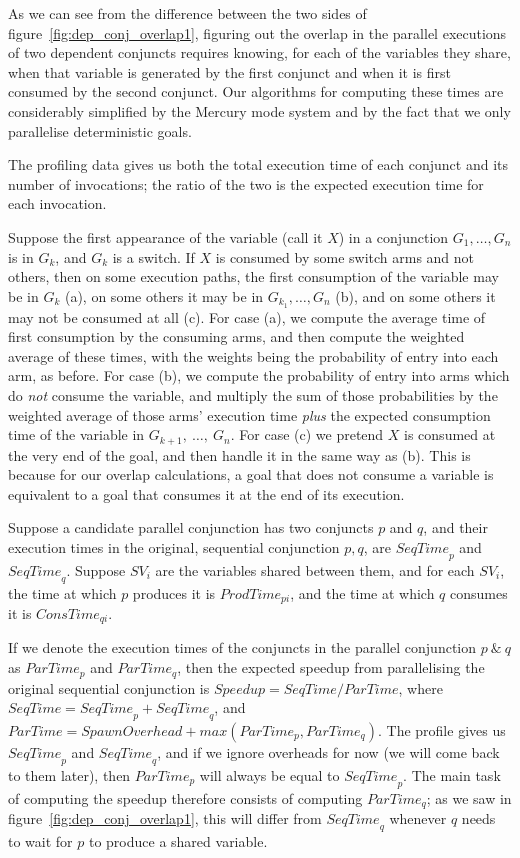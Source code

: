 As we can see from the difference between the two sides of
figure~\ref{fig:dep_conj_overlap1},
figuring out the overlap
in the parallel executions of two dependent conjuncts
requires knowing, for each of the variables they share,
when that variable is generated by the first conjunct and
when it is first consumed by the second conjunct.
Our algorithms for computing these times are considerably simplified
by the Mercury mode system
and by the fact that we only parallelise deterministic goals.

The profiling data gives us both
the total execution time of each conjunct
and its number of invocations;
the ratio of the two is the expected execution time for each invocation.


Suppose the first appearance of the variable (call it $X$)
in a conjunction $G_1, \ldots, G_n$ is in $G_k$, and $G_k$ is a switch.
If $X$ is consumed by some switch arms and not others,
then on some execution paths,
the first consumption of the variable may be in $G_k$ (a),
on some others it may be in $G_{k_1}, \ldots, G_n$ (b),
and on some others it may not be consumed at all (c).
For case (a),
we compute the average time of first consumption by the consuming arms,
and then compute the weighted average of these times,
with the weights being the probability of entry into each arm, as before.
For case (b), we compute the probability of entry
into arms which do \emph{not} consume the variable,
and multiply the sum of those probabilities
by the weighted average of those arms' execution time
\emph{plus} the expected consumption time of the variable
in $G_{k+1},~\ldots,~G_n$.
For case (c)
we pretend $X$ is consumed at the very end of the goal,
and then handle it in the same way as (b).
This is because for our overlap calculations,
a goal that does not consume a variable is equivalent to
a goal that consumes it at the end of its execution.


Suppose a candidate parallel conjunction has two conjuncts $p$ and $q$,
and their execution times in the original, sequential conjunction $p, q$,
are ${SeqTime}_p$ and ${SeqTime}_q$.
Suppose ${SV}_i$ are the variables shared between them,
and for each ${SV}_i$,
the time at which $p$ produces it is ${ProdTime}_{pi}$, and
the time at which $q$ consumes it is ${ConsTime}_{qi}$.

If we denote the execution times of the conjuncts
in the parallel conjunction $p~\&~q$
as ${ParTime}_p$ and ${ParTime}_q$,
then the expected speedup
from parallelising the original sequential conjunction
is ${Speedup} = {SeqTime} / {ParTime}$,
where ${SeqTime} = {SeqTime}_p + {SeqTime}_q$,
and ${ParTime} = {SpawnOverhead} + {max}({ParTime}_p, {ParTime}_q)$.
The profile gives us ${SeqTime}_p$ and ${SeqTime}_q$,
and if we ignore overheads for now (we will come back to them later),
then ${ParTime}_p$ will always be equal to ${SeqTime}_p$.
The main task of computing the speedup
therefore consists of computing ${ParTime}_q$;
as we saw in figure~\ref{fig:dep_conj_overlap1},
this will differ from ${SeqTime}_q$
whenever $q$ needs to wait for $p$ to produce a shared variable.

